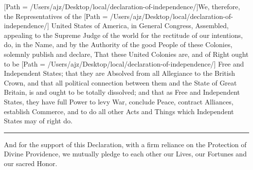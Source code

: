 \documentclass{article}
\begin{document}
[Path = /Users/ajz/Desktop/local/declaration-of-independence/]We,
therefore, \rmfamily the Representatives of the
[Path = /Users/ajz/Desktop/local/declaration-of-independence/] United
States of America, \rmfamily in General Congress, Assembled, appealing
to the Supreme Judge of the world for the rectitude of our intentions,
do, in the Name, and by the Authority of the good People of these
Colonies, solemnly publish and declare, That these United Colonies
are, and of Right ought to be [Path = /Users/ajz/Desktop/local/declaration-of-independence/]
Free and Independent States; \rmfamily
that they are Absolved from all Allegiance to the British Crown, and
that all political connection between them and the State of Great
Britain, is and ought to be totally dissolved; and that as Free and
Independent States, they have full Power to levy War, conclude Peace,
contract Alliances, establish Commerce, and to do all other Acts and
Things which Independent States may of right
do.\rule[.5ex]{2em}{.2pt}And for the support of this Declaration, with
a firm reliance on the Protection of Divine Providence, we mutually
pledge to each other our Lives, our Fortunes and our sacred Honor.
\end{document}
